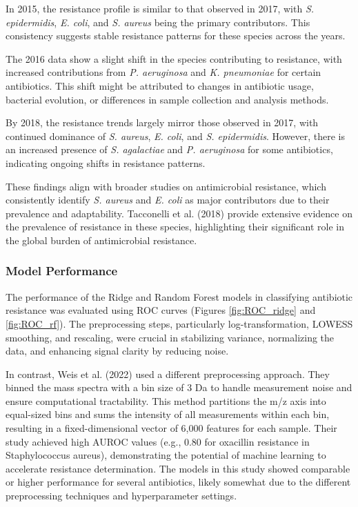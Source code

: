 \documentclass[english,11pt,a4paper,titlepage]{article}
\begin{document}
In 2015, the resistance profile is similar to that observed in 2017, with \textit{S. epidermidis}, \textit{E. coli}, and \textit{S. aureus} being the primary contributors. This consistency suggests stable resistance patterns for these species across the years.

The 2016 data show a slight shift in the species contributing to resistance, with increased contributions from \textit{P. aeruginosa} and \textit{K. pneumoniae} for certain antibiotics. This shift might be attributed to changes in antibiotic usage, bacterial evolution, or differences in sample collection and analysis methods.

By 2018, the resistance trends largely mirror those observed in 2017, with continued dominance of \textit{S. aureus}, \textit{E. coli}, and \textit{S. epidermidis}. However, there is an increased presence of \textit{S. agalactiae} and \textit{P. aeruginosa} for some antibiotics, indicating ongoing shifts in resistance patterns.

These findings align with broader studies on antimicrobial resistance, which consistently identify \textit{S. aureus} and \textit{E. coli} as major contributors due to their prevalence and adaptability. Tacconelli et al. (2018) \cite{tacconelliDiscoveryResearchDevelopment2018} provide extensive evidence on the prevalence of resistance in these species, highlighting their significant role in the global burden of antimicrobial resistance.

\subsubsection*{Model Performance}
The performance of the Ridge and Random Forest models in classifying antibiotic resistance was evaluated using ROC curves (Figures \ref{fig:ROC_ridge} and \ref{fig:ROC_rf}). The preprocessing steps, particularly log-transformation, LOWESS smoothing, and rescaling, were crucial in stabilizing variance, normalizing the data, and enhancing signal clarity by reducing noise.

In contrast, Weis et al. (2022) \cite{weisDirectAntimicrobialResistance2022} used a different preprocessing approach. They binned the mass spectra with a bin size of 3 Da to handle measurement noise and ensure computational tractability. This method partitions the m/z axis into equal-sized bins and sums the intensity of all measurements within each bin, resulting in a fixed-dimensional vector of 6,000 features for each sample. Their study achieved high AUROC values (e.g., 0.80 for oxacillin resistance in Staphylococcus aureus), demonstrating the potential of machine learning to accelerate resistance determination. The models in this study showed comparable or higher performance for several antibiotics, likely somewhat due to the different preprocessing techniques and hyperparameter settings.
\end{document}
